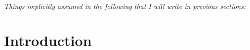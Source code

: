 \textit{
Things implicitly assumed in the following that I will write in previous sections:
}

\section{Introduction}
